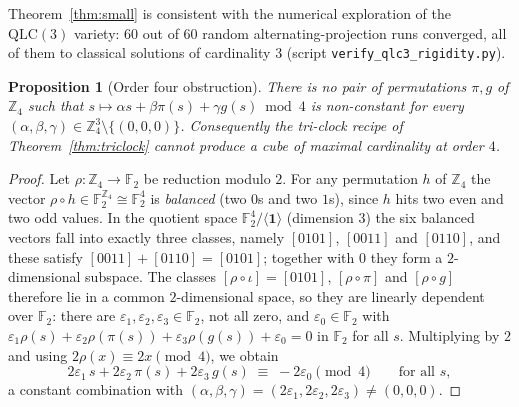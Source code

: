 \documentclass[11pt]{amsart}
\newtheorem{proposition}[theorem]{Proposition}
\theoremstyle{definition}
\newcommand{\Z}{\mathbb{Z}}
\newcommand{\F}{\mathbb{F}}
\newcommand{\QLC}{\mathrm{QLC}}
\begin{document}
Theorem~\ref{thm:small} is consistent with the numerical exploration of
the $\QLC(3)$ variety: $60$ out of $60$ random alternating-projection runs
converged, all of them to classical solutions of cardinality $3$ (script
\texttt{verify\_qlc3\_rigidity.py}).

\begin{proposition}[Order four obstruction]\label{prop:four}
There is no pair of permutations $\pi,g$ of $\Z_4$ such that
$s\mapsto \alpha s+\beta\pi(s)+\gamma g(s) \bmod4$ is non-constant for
every $(\alpha,\beta,\gamma)\in\Z_4^3\setminus\{(0,0,0)\}$.  Consequently
the tri-clock recipe of Theorem~\ref{thm:triclock} cannot produce a cube of
maximal cardinality at order $4$.
\end{proposition}

\begin{proof}
Let $\rho:\Z_4\to\F_2$ be reduction modulo $2$.  For any permutation $h$
of $\Z_4$ the vector $\rho\circ h\in\F_2^{\Z_4}\cong\F_2^4$ is
\emph{balanced} (two $0$s and two $1$s), since $h$ hits two even and two
odd values.  In the quotient space $\F_2^4/\langle\mathbf1\rangle$
(dimension $3$) the six balanced vectors fall into exactly three classes,
namely $[0101]$, $[0011]$ and $[0110]$, and these satisfy
$[0011]+[0110]=[0101]$; together with $0$ they form a $2$-dimensional
subspace.  The classes $[\rho\circ\iota]=[0101]$, $[\rho\circ\pi]$ and
$[\rho\circ g]$ therefore lie in a common $2$-dimensional space, so they
are linearly dependent over $\F_2$: there are
$\varepsilon_1,\varepsilon_2,\varepsilon_3\in\F_2$, not all zero, and
$\varepsilon_0\in\F_2$ with
$\varepsilon_1\rho(s)+\varepsilon_2\rho(\pi(s))+\varepsilon_3\rho(g(s))
+\varepsilon_0=0$ in $\F_2$ for all $s$.  Multiplying by $2$ and using
$2\rho(x)\equiv2x\pmod4$, we obtain
\[
2\varepsilon_1\,s+2\varepsilon_2\,\pi(s)+2\varepsilon_3\,g(s)
\;\equiv\;-2\varepsilon_0\pmod 4\qquad\text{for all } s ,
\]
a constant combination with
$(\alpha,\beta,\gamma)=(2\varepsilon_1,2\varepsilon_2,2\varepsilon_3)
\ne(0,0,0)$.
\end{proof}
\end{document}
